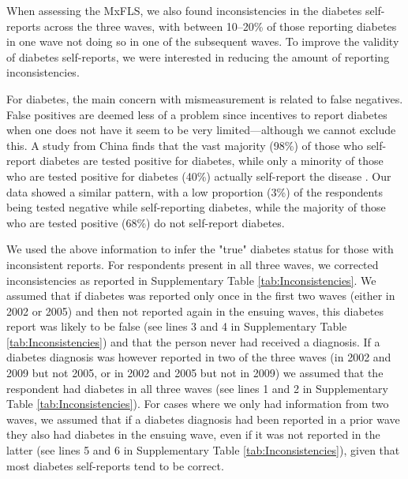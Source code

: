 \documentclass[12pt,english]{article}
\begin{document}
When assessing the \ac{MxFLS}, we also found inconsistencies in the diabetes self-reports across the three waves, with between 10--20\% of those reporting diabetes in one wave not doing so in one of the subsequent waves. To improve the validity of diabetes self-reports, we were interested in reducing the amount of reporting inconsistencies.

For diabetes, the main concern with mismeasurement is related to false negatives. False positives are deemed less of a problem since incentives to report diabetes when one does not have it seem to be very limited---although we cannot exclude this.  A study from China finds that the vast majority (98\%) of those who self-report diabetes are tested positive for diabetes, while only a minority  of those who are tested positive for diabetes (40\%) actually self-report the disease \parencite{Yuan2015}.  Our data showed a similar pattern, with a low proportion (3\%) of the respondents being tested negative while self-reporting diabetes, while the majority of those who are tested positive (68\%) do not self-report diabetes.

We used the above information to infer the "true" diabetes status for those with inconsistent reports. For respondents present in all three waves, we corrected inconsistencies as reported in Supplementary Table \ref{tab:Inconsistencies}. We assumed that if diabetes was reported only once in the first two waves (either in 2002 or 2005) and then not reported again in the ensuing waves, this diabetes report was likely to be false (see lines 3 and 4 in Supplementary Table \ref{tab:Inconsistencies}) and that the person never had received a diagnosis. If a diabetes diagnosis was however reported in two of the three waves (in 2002 and 2009 but not 2005, or in 2002 and 2005 but not in 2009) we assumed that the respondent had diabetes in all three waves (see lines 1 and 2 in Supplementary Table \ref{tab:Inconsistencies}). For cases where we only had information from two waves, we assumed that if a diabetes diagnosis had been reported in a prior wave they also had diabetes in the ensuing wave, even if it was not reported in the latter (see lines 5 and 6 in Supplementary Table \ref{tab:Inconsistencies}), given that most diabetes self-reports tend to be correct.
\end{document}

